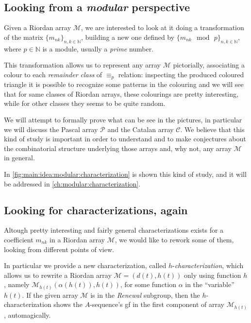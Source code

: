 

\subsection{Looking from a \emph{modular} perspective}

Given a Riordan array $\mathcal{M}$, we are interested to look at it
doing a transformation of the matrix $\lbrace m_{nk}\rbrace_{n,k\in\mathbb{N}}$,
building a new one defined by $\lbrace m_{nk}\mod\,p\rbrace_{n,k\in\mathbb{N}}$,
where $p\in\mathbb{N}$ is a module, usually a \emph{prime} number.

This transformation allows us to represent any array $\mathcal{M}$ pictorially,
associating a colour to each \emph{remainder class} of $\equiv_{p}$ relation:
inspecting the produced coloured triangle it is possible to recognize some
patterns in the colouring and we will see that for same classes of Riordan
arrays, these colourings are pretty interesting, while for other classes they
seems to be quite random.

We will attempt to formally prove what can be see in the pictures, in
particular we will discuss the Pascal array $\mathcal{P}$ and the Catalan array
$\mathcal{C}$.  We believe that this kind of study is important in order to
understand and to make conjectures about the combinatorial structure underlying
those arrays and, why not, any array $\mathcal{M}$ in general.



In \autoref{fig:main:idea:modular:characterization} is shown this kind of study,
and it will be addressed in \autoref{ch:modular:characterization}.

\subsection{Looking for characterizations, again}

Altough pretty interesting and fairly general characterizations exists for
a coefficient $m_{nk}$ in a Riordan array $\mathcal{M}$, we would like to
rework some of them, looking from different points of view.

In particular we provide a new characterization, called $h$-\emph{characterization},
which allows us to rewrite a Riordan array $\mathcal{M}=(d(t),h(t))$ only
using function $h$, namely $\mathcal{M}_{h(t)}(\alpha(h(t)),h(t))$, for some
function $\alpha$ in the ``variable'' $h(t)$. If the given array $\mathcal{M}$
is in the \emph{Renewal} subgroup, then the $h$-characterization shows the $A$-sequence's
\ac{gf} in the first component of array $\mathcal{M}_{h(t)}$, automagically.


